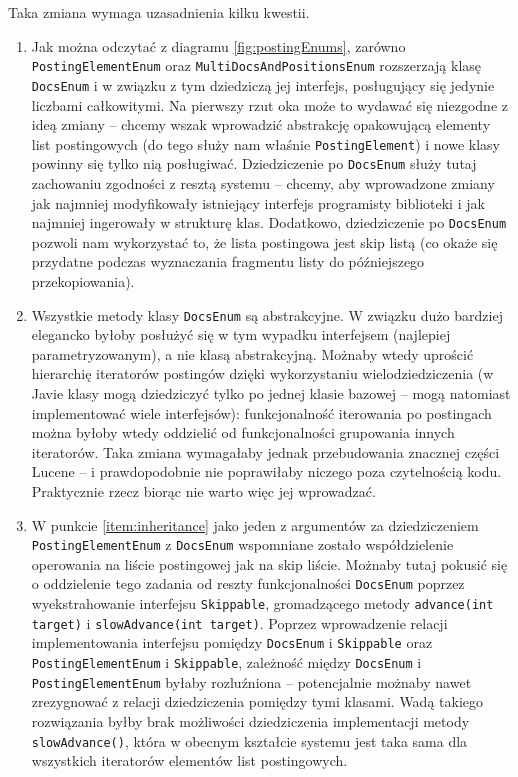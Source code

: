 Taka zmiana wymaga uzasadnienia kilku kwestii.
\begin{enumerate}
 \item \label{item:inheritance} Jak można odczytać z diagramu \ref{fig:postingEnums}, zarówno \texttt{PostingElementEnum} oraz \texttt{MultiDocsAndPositionsEnum} rozszerzają klasę \texttt{DocsEnum} i w związku z tym dziedziczą jej interfejs, posługujący się jedynie liczbami całkowitymi. Na pierwszy rzut oka może to wydawać się niezgodne z ideą zmiany -- chcemy wszak wprowadzić abstrakcję opakowującą elementy list postingowych (do tego służy nam właśnie \texttt{PostingElement}) i nowe klasy powinny się tylko nią posługiwać. Dziedziczenie po \texttt{DocsEnum} służy tutaj zachowaniu zgodności z resztą systemu -- chcemy, aby wprowadzone zmiany jak najmniej modyfikowały istniejący interfejs programisty biblioteki i jak najmniej ingerowały w strukturę klas. Dodatkowo, dziedziczenie po \texttt{DocsEnum} pozwoli nam wykorzystać to, że lista postingowa jest skip listą (co okaże się przydatne podczas wyznaczania fragmentu listy do późniejszego przekopiowania).
 \item Wszystkie metody klasy \texttt{DocsEnum} są abstrakcyjne. W związku dużo bardziej elegancko byłoby posłużyć się w tym wypadku interfejsem (najlepiej parametryzowanym), a nie klasą abstrakcyjną. Możnaby wtedy uprościć hierarchię iteratorów postingów dzięki wykorzystaniu wielodziedziczenia (w Javie klasy mogą dziedziczyć tylko po jednej klasie bazowej -- mogą natomiast implementować wiele interfejsów): funkcjonalność iterowania po postingach można byłoby wtedy oddzielić od funkcjonalności grupowania innych iteratorów. Taka zmiana wymagałaby jednak przebudowania znacznej części Lucene -- i prawdopodobnie nie poprawiłaby niczego poza czytelnością kodu. Praktycznie rzecz biorąc nie warto więc jej wprowadzać.
 \item W punkcie \ref{item:inheritance} jako jeden z argumentów za dziedziczeniem \texttt{PostingElementEnum} z \texttt{DocsEnum} wspomniane zostało współdzielenie operowania na liście postingowej jak na skip liście. Możnaby tutaj pokusić się o oddzielenie tego zadania od reszty funkcjonalności \texttt{DocsEnum} poprzez wyekstrahowanie interfejsu \texttt{Skippable}, gromadzącego metody \texttt{advance(int target)} i \texttt{slowAdvance(int target)}. Poprzez wprowadzenie relacji implementowania interfejsu pomiędzy \texttt{DocsEnum} i \texttt{Skippable} oraz \texttt{PostingElementEnum} i \texttt{Skippable}, zależność między \texttt{DocsEnum} i \texttt{PostingElementEnum} byłaby rozluźniona -- potencjalnie możnaby nawet zrezygnować z relacji dziedziczenia pomiędzy tymi klasami. Wadą takiego rozwiązania byłby brak możliwości dziedziczenia implementacji metody \texttt{slowAdvance()}, która w obecnym kształcie systemu jest taka sama dla wszystkich iteratorów elementów list postingowych.
\end{enumerate}

